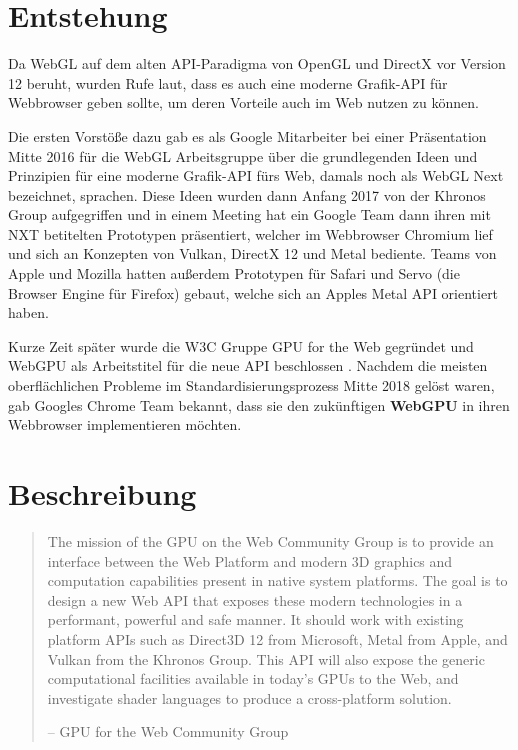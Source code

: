 \documentclass[oneside]{ausarbeitung}
\newcommand*{\quotize}[1]{\glqq #1\grqq}
\begin{document}
\section{Entstehung \cite[Vgl.][]{wikipedia:webgpu}}
Da WebGL auf dem alten API-Paradigma von OpenGL und DirectX vor Version 12 beruht, wurden Rufe laut, dass es auch eine \quotize{moderne} Grafik-API für Webbrowser geben sollte, um deren Vorteile auch im Web nutzen zu können.

Die ersten Vorstöße dazu gab es als Google Mitarbeiter bei einer Präsentation Mitte 2016 für die WebGL Arbeitsgruppe über die grundlegenden Ideen und Prinzipien für eine moderne Grafik-API fürs Web, damals noch als \quotize{WebGL Next} bezeichnet, sprachen. Diese Ideen wurden dann Anfang 2017 von der Khronos Group aufgegriffen und in einem Meeting hat ein Google Team dann ihren mit \quotize{NXT} betitelten Prototypen präsentiert, welcher im Webbrowser Chromium lief und sich an Konzepten von Vulkan, DirectX 12 und Metal bediente. Teams von Apple und Mozilla hatten außerdem Prototypen für Safari und Servo (die Browser Engine für Firefox) gebaut, welche sich an Apples Metal API orientiert haben. 

Kurze Zeit später wurde die W3C Gruppe \quotize{GPU for the Web} gegründet und \quotize{WebGPU} als Arbeitstitel für die neue API beschlossen \cite{golem:webgpu}. Nachdem die meisten oberflächlichen Probleme im Standardisierungsprozess Mitte 2018 gelöst waren, gab Googles Chrome Team bekannt, dass sie den zukünftigen \textbf{WebGPU} in ihren Webbrowser implementieren möchten.

\section{Beschreibung}
\begin{minipage} {\textwidth}
\begin{quote}
\quotize{The mission of the GPU on the Web Community Group is to provide an interface between the Web Platform and modern 3D graphics and computation capabilities present in native system platforms. The goal is to design a new Web API that exposes these modern technologies in a performant, powerful and safe manner. It should work with existing platform APIs such as Direct3D 12 from Microsoft, Metal from Apple, and Vulkan from the Khronos Group. This API will also expose the generic computational facilities available in today's GPUs to the Web, and investigate shader languages to produce a cross-platform solution.}

-- GPU for the Web Community Group \cite{w3:community_gpu}
\end{quote}
\end{minipage}
\end{document}
